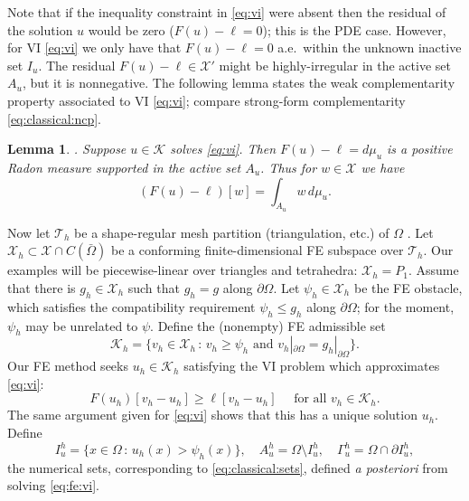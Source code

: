 \documentclass[]{interact}
\theoremstyle{plain}%
\newtheorem{lemma}[theorem]{Lemma}
\theoremstyle{definition}
\theoremstyle{remark}
\newcommand{\cK}{\mathcal{K}}
\newcommand{\cT}{\mathcal{T}}
\newcommand{\cX}{\mathcal{X}}
\begin{document}
Note that if the inequality constraint in \eqref{eq:vi} were absent then the residual of the solution $u$ would be zero ($F(u)-\ell=0$); this is the PDE case.  However, for VI \eqref{eq:vi} we only have that $F(u)-\ell=0$ a.e.~within the unknown inactive set $I_u$.  The residual $F(u)-\ell\in \cX'$ might be highly-irregular in the active set $A_u$, but it is nonnegative.  The following lemma states the weak complementarity property associated to VI \eqref{eq:vi}; compare strong-form complementarity \eqref{eq:classical:ncp}.

\begin{lemma} \label{lem:measure}\cite[Theorem II.6.9]{KinderlehrerStampacchia1980}.  Suppose $u\in \cK$ solves \eqref{eq:vi}.  Then $F(u)-\ell=d\mu_u$ is a positive Radon measure supported in the active set $A_u$.  Thus for $w\in\cX$ we have
\begin{equation}
(F(u)-\ell)[w] = \int_{A_u} w\, d\mu_u. \label{eq:measure}
\end{equation}
\end{lemma}

Now let $\cT_h$ be a shape-regular mesh partition (triangulation, etc.) of $\Omega$ \cite{AinsworthOden2000,ElmanSilvesterWathen2014}.  Let $\cX_h \subset \cX \cap C(\bar\Omega)$ be a conforming finite-dimensional FE subspace over $\cT_h$.  Our examples will be piecewise-linear over triangles and tetrahedra: $\cX_h=P_1$.  Assume that there is $g_h\in\cX_h$ such that $g_h=g$ along $\partial \Omega$.  Let $\psi_h \in \cX_h$ be the FE obstacle, which satisfies the compatibility requirement $\psi_h \le g_h$ along $\partial\Omega$; for the moment, $\psi_h$ may be unrelated to $\psi$.  Define the (nonempty) FE admissible set
\begin{equation} \label{eq:fe:admissible}
\cK_h = \{v_h \in \cX_h \,:\, v_h \ge \psi_h \text{ and } v_h|_{\partial \Omega} = g_h|_{\partial\Omega}\}.
\end{equation}
Our FE method seeks $u_h\in\cK_h$ satisfying the VI problem which approximates \eqref{eq:vi}:
\begin{equation} \label{eq:fe:vi}
F(u_h)[v_h - u_h] \ge \ell[v_h - u_h] \quad \text{ for all } v_h \in \cK_h.
\end{equation}
The same argument given for \eqref{eq:vi} shows that this has a unique solution $u_h$.  Define
\begin{equation}
  I_u^h = \{x \in \Omega \,:\, u_h(x) > \psi_h(x)\}, \quad A_u^h = \Omega \setminus I_u^h, \quad \Gamma_u^h = \Omega \cap \partial I_u^h, \label{eq:fe:sets}
\end{equation}
the numerical sets, corresponding to \eqref{eq:classical:sets}, defined \emph{a posteriori} from solving \eqref{eq:fe:vi}.
\end{document}
